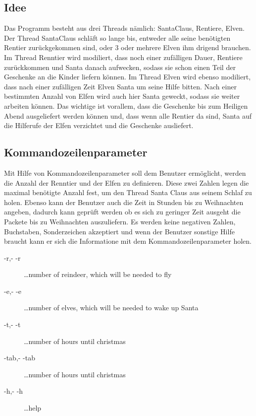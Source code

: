 \documentclass[a4paper,12pt]{exam}
\begin{document}
\subsection{Idee}
Das Programm besteht aus drei Threads nämlich: SantaClaus, Rentiere, Elven. Der Thread SantaClaus schläft so lange bis, entweder alle seine benötigten Rentier zurückgekommen sind, oder 3 oder mehrere Elven ihm drigend brauchen.
Im Thread Renntier wird modiliert, dass noch einer zufälligen Dauer, Rentiere zurückkommen und Santa danach aufwecken, sodass sie schon einen Teil der Geschenke an die Kinder liefern können. Im Thread Elven wird ebenso modiliert, dass
nach einer zufälligen Zeit Elven Santa um seine Hilfe bitten. Nach einer bestimmten Anzahl von Elfen wird auch hier Santa geweckt, sodass sie weiter arbeiten können. Das wichtige ist vorallem, dass die Geschenke bis zum Heiligen Abend
ausgeliefert werden können und, dass wenn alle Rentier da sind, Santa auf die Hilferufe der Elfen verzichtet und die Geschenke ausliefert.

\subsection{Kommandozeilenparameter}
Mit Hilfe von Kommandozeilenparameter soll dem Benutzer ermöglicht, werden die Anzahl der Renntier und der Elfen zu definieren. Diese zwei Zahlen legen die maximal benötigte Anzahl fest, um den Thread Santa Claus aus seinem Schlaf zu holen.
Ebenso kann der Benutzer auch die Zeit in Stunden bis zu Weihnachten angeben, dadurch kann geprüft werden ob es sich zu geringer Zeit ausgeht die Packete bis zu Weihnachten auszuliefern.
Es werden keine negativen Zahlen, Buchstaben, Sonderzeichen akzeptiert und wenn der Benutzer sonstige Hilfe braucht kann er sich die Informatione mit dem Kommandozeilenparameter holen.
\begin{description}
    \item[-r,- -r]{\dots number of reindeer, which will be needed to fly}
    \item[-e,- -e]{\dots number of elves, which will be needed to wake up Santa}
    \item[-t,- -t]{\dots number of hours until christmas}
    \item[-tab,- -tab]{\dots number of hours until christmas}
    \item[-h,- -h]{\dots help}
\end{description}
\end{document}
